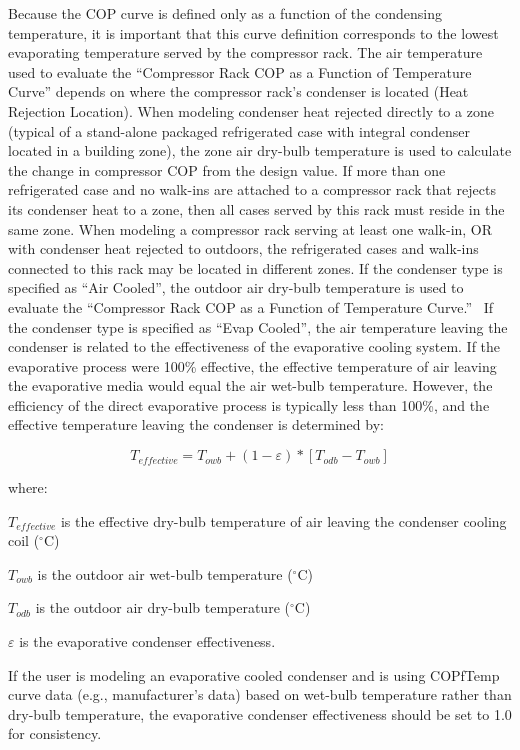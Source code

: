 Because the COP curve is defined only as a function of the condensing temperature, it is important that this curve definition corresponds to the lowest evaporating temperature served by the compressor rack. The air temperature used to evaluate the ``Compressor Rack COP as a Function of Temperature Curve'' depends on where the compressor rack's condenser is located (Heat Rejection Location). When modeling condenser heat rejected directly to a zone (typical of a stand-alone packaged refrigerated case with integral condenser located in a building zone), the zone air dry-bulb temperature is used to calculate the change in compressor COP from the design value. If more than one refrigerated case and no walk-ins are attached to a compressor rack that rejects its condenser heat to a zone, then all cases served by this rack must reside in the same zone. When modeling a compressor rack serving at least one walk-in, OR with condenser heat rejected to outdoors, the refrigerated cases and walk-ins connected to this rack may be located in different zones. If the condenser type is specified as ``Air Cooled'', the outdoor air dry-bulb temperature is used to evaluate the ``Compressor Rack COP as a Function of Temperature Curve.''~ If the condenser type is specified as ``Evap Cooled'', the air temperature leaving the condenser is related to the effectiveness of the evaporative cooling system. If the evaporative process were 100\% effective, the effective temperature of air leaving the evaporative media would equal the air wet-bulb temperature. However, the efficiency of the direct evaporative process is typically less than 100\%, and the effective temperature leaving the condenser is determined by:

\begin{equation}
{T_{effective}} = {T_{owb}} + (1 - \varepsilon )*[{T_{odb}} - {T_{owb}}]
\end{equation}

where:

\({T_{effective}}\) is the effective dry-bulb temperature of air leaving the condenser cooling coil (\(^{\circ}\)C)

\({T_{owb}}\) is the outdoor air wet-bulb temperature (\(^{\circ}\)C)

\({T_{odb}}\) is the outdoor air dry-bulb temperature (\(^{\circ}\)C)

\(\varepsilon\) is the evaporative condenser effectiveness.

If the user is modeling an evaporative cooled condenser and is using COPfTemp curve data (e.g., manufacturer's data) based on wet-bulb temperature rather than dry-bulb temperature, the evaporative condenser effectiveness should be set to 1.0 for consistency.

